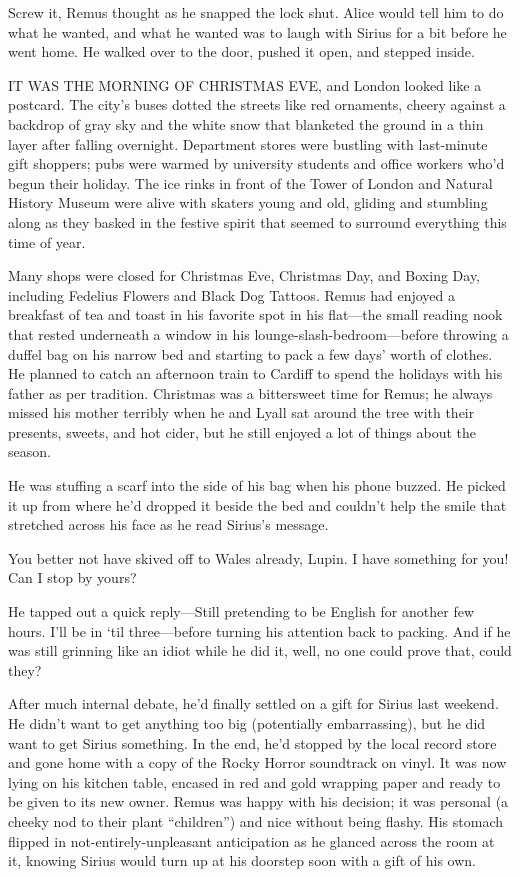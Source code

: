 Screw it, Remus thought as he snapped the lock shut. Alice would tell him to do what he wanted, and what he wanted was to laugh with Sirius for a bit before he went home. He walked over to the door, pushed it open, and stepped inside.

\newpage


IT WAS THE MORNING OF CHRISTMAS EVE, and London looked like a postcard. The city’s buses dotted the streets like red ornaments, cheery against a backdrop of gray sky and the white snow that blanketed the ground in a thin layer after falling overnight. Department stores were bustling with last-minute gift shoppers; pubs were warmed by university students and office workers who’d begun their holiday. The ice rinks in front of the Tower of London and Natural History Museum were alive with skaters young and old, gliding and stumbling along as they basked in the festive spirit that seemed to surround everything this time of year.

Many shops were closed for Christmas Eve, Christmas Day, and Boxing Day, including Fedelius Flowers and Black Dog Tattoos. Remus had enjoyed a breakfast of tea and toast in his favorite spot in his flat—the small reading nook that rested underneath a window in his lounge-slash-bedroom—before throwing a duffel bag on his narrow bed and starting to pack a few days’ worth of clothes. He planned to catch an afternoon train to Cardiff to spend the holidays with his father as per tradition. Christmas was a bittersweet time for Remus; he always missed his mother terribly when he and Lyall sat around the tree with their presents, sweets, and hot cider, but he still enjoyed a lot of things about the season.

He was stuffing a scarf into the side of his bag when his phone buzzed. He picked it up from where he’d dropped it beside the bed and couldn’t help the smile that stretched across his face as he read Sirius’s message.

You better not have skived off to Wales already, Lupin. I have something for you! Can I stop by yours?

He tapped out a quick reply—Still pretending to be English for another few hours. I’ll be in ‘til three—before turning his attention back to packing. And if he was still grinning like an idiot while he did it, well, no one could prove that, could they?

After much internal debate, he’d finally settled on a gift for Sirius last weekend. He didn’t want to get anything too big (potentially embarrassing), but he did want to get Sirius something. In the end, he’d stopped by the local record store and gone home with a copy of the Rocky Horror soundtrack on vinyl. It was now lying on his kitchen table, encased in red and gold wrapping paper and ready to be given to its new owner. Remus was happy with his decision; it was personal (a cheeky nod to their plant “children”) and nice without being flashy. His stomach flipped in not-entirely-unpleasant anticipation as he glanced across the room at it, knowing Sirius would turn up at his doorstep soon with a gift of his own.

